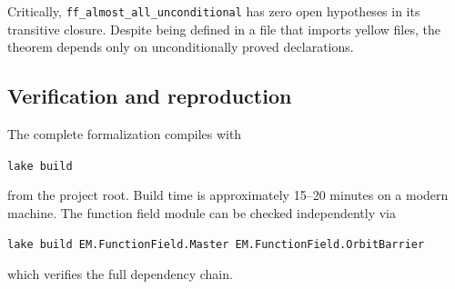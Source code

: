 Critically, \texttt{ff\_almost\_all\_unconditional} has zero open hypotheses
in its transitive closure. Despite being defined in a file that imports
yellow files, the theorem depends only on unconditionally proved declarations.

\subsection{Verification and reproduction}

The complete formalization compiles with
\begin{center}
\texttt{lake build}
\end{center}
from the project root. Build time is approximately 15--20 minutes on a
modern machine. The function field module can be checked independently via
\begin{center}
\texttt{lake build EM.FunctionField.Master EM.FunctionField.OrbitBarrier}
\end{center}
which verifies the full dependency chain.
